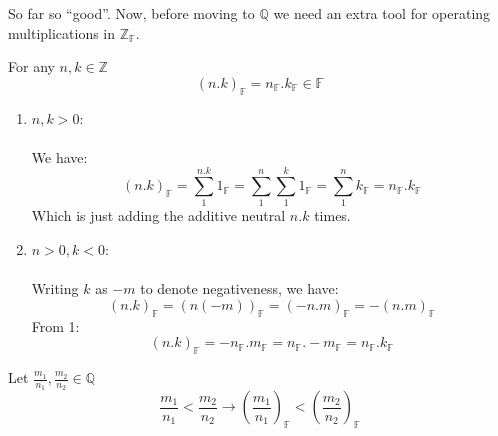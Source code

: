 So far so \textquotedblleft good\textquotedblright. Now, before moving to $\mathbb{Q}$ we need an extra tool for operating multiplications in $\mathbb{Z_F}$.

\begin{lemma}\label{le:mult-in-Z}
For any $n, k \in \mathbb{Z}$ \\
$$(n.k)_\mathbb{F} = n_\mathbb{F} . k_\mathbb{F} \in \mathbb{F}$$
\end{lemma}

\begin{bookproof}
\begin{enumerate}
\item $n, k > 0:$\\\\
We have:
$$(n . k)_\mathbb{F} = \sum_{1}^{n.k} 1_\mathbb{F} = \sum_{1}^{n} \sum_{1}^{k} 1_\mathbb{F} =  \sum_{1}^{n} k_\mathbb{F} = n_\mathbb{F} . k_\mathbb{F}$$
Which is just adding the additive neutral $n.k$ times.


\item $n > 0, k < 0:$ \\\\
Writing $k$ as $-m$ to denote negativeness, we have:
$$(n.k)_\mathbb{F} = (n(-m))_\mathbb{F} = (-n.m)_\mathbb{F} = -(n.m)_\mathbb{F}$$
From 1:
$$(n.k)_\mathbb{F} = -n_\mathbb{F}.m_\mathbb{F} = n_\mathbb{F}.-m_\mathbb{F} = n_\mathbb{F}.k_\mathbb{F}$$
\end{enumerate}
\end{bookproof}

\begin{lemma}\label{le:ordering-Q}
Let $\frac{m_1}{n_1}, \frac{m_2}{n_2} \in \mathbb{Q}$ \\
$$\frac{m_1}{n_1} < \frac{m_2}{n_2} \rightarrow (\frac{m_1}{n_1})_\mathbb{F} < (\frac{m_2}{n_2})_\mathbb{F}$$
\end{lemma}

